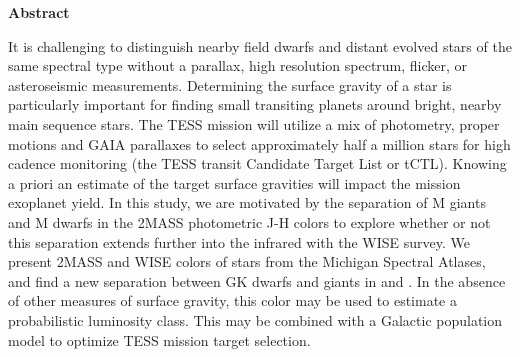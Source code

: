 {}

\vspace*{\fill}
\begin{center}

\textbf{Abstract}

It is challenging to distinguish nearby field dwarfs and distant evolved stars of the same spectral type without a parallax, high resolution spectrum, flicker, or asteroseismic measurements. Determining the surface gravity of a star is particularly important for finding small transiting planets around bright, nearby main sequence stars. The TESS mission will utilize a mix of photometry, proper motions and GAIA parallaxes to select approximately half a million stars for high cadence monitoring (the TESS transit Candidate Target List or tCTL). Knowing a priori an estimate of the target surface gravities will impact the mission exoplanet yield.  In this study, we are motivated by the separation of M giants and M dwarfs in the 2MASS photometric J-H colors to explore whether or not this separation extends further into the infrared with the WISE survey.  We present 2MASS and WISE colors of stars from the Michigan Spectral Atlases, and find a new separation between GK dwarfs and giants in \jwone and \jwtwo.  In the absence of other measures of surface gravity, this color may be used to estimate a probabilistic luminosity class.  This may be combined with a Galactic population model to optimize TESS mission target selection.


\end{center}
\vspace{\fill}

